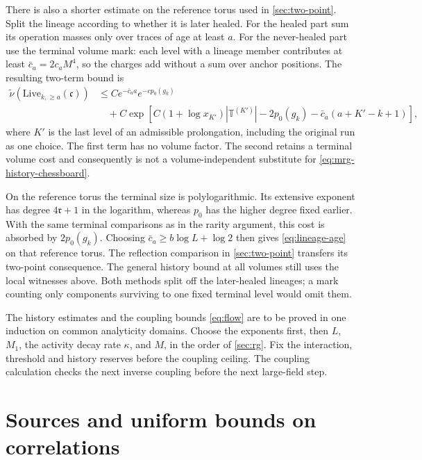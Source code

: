 \documentclass[11pt,letterpaper,reqno]{amsart}
\theoremstyle{definition}
\theoremstyle{remark}
\begin{document}
There is also a shorter estimate on the reference torus used in
\cref{sec:two-point}. Split the lineage according to whether it
is later healed. For the healed part sum its operation masses
only over traces of age at least $a$. For the never-healed part
use the terminal volume mark: each level with a lineage member
contributes at least $\bar c_a=2c_aM^4$, so the charges add
without a sum over anchor positions. The resulting two-term
bound is
\begin{equation}\label{eq:two-term-age}
 \begin{split}
 \widetilde\nu(\mathrm{Live}_{k,\ge a}(\mathfrak c))
 &\le Ce^{-\bar c_a a}e^{-cp_0(g_k)}\\
 &\quad+C\exp\!\left[C(1+\log x_{K'})|\mathbb T^{(K')}|
          -2p_0(g_k)-\bar c_a(a+K'-k+1)\right],
 \end{split}
\end{equation}
where $K'$ is the last level of an admissible prolongation,
including the original run as one choice. The first term has
no volume factor. The second retains a terminal volume cost
and consequently is not a volume-independent substitute for
\eqref{eq:mrg-history-chessboard}.

On the reference torus the terminal size is polylogarithmic.
Its extensive exponent has degree $4\mathfrak r+1$ in the
logarithm, whereas $p_0$ has the higher degree fixed earlier.
With the same terminal comparisons as in the rarity argument,
this cost is absorbed by $2p_0(g_k)$. Choosing
$\bar c_a\ge b\log L+\log2$ then gives
\eqref{eq:lineage-age} on that reference torus. The reflection
comparison in \cref{sec:two-point} transfers its two-point
consequence. The general history bound at all volumes still
uses the local witnesses above. Both methods split off the
later-healed lineages; a mark counting only components surviving
to one fixed terminal level would omit them.

The history estimates and the coupling bounds \eqref{eq:flow}
are to be proved in one induction on common analyticity domains.
Choose the exponents first, then $L$, $M_1$, the activity decay
rate $\kappa$, and $M$, in the order of \cref{sec:rg}.
Fix the interaction, threshold and history reserves before the
coupling ceiling. The coupling
calculation checks the next inverse coupling before the next
large-field step.


\section{Sources and uniform bounds on correlations}\label{sec:sources}
\end{document}
